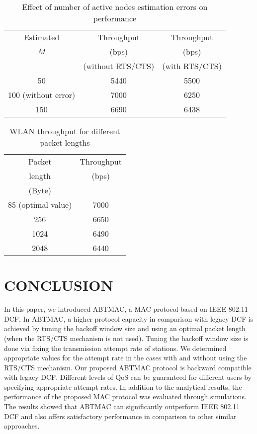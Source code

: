 \documentclass[10pt,twocolumn,oneside,submit]{JCNtran}
\begin{document}
\begin{table}
\caption{Effect of number of active nodes estimation errors on performance}
\label{tab:tab4}
\begin{center}
{\small \begin{tabular}{|c|c|c|}\hline
 Estimated & Throughput & Throughput \\
$M$ & (bps) & (bps) \\
  & (without RTS/CTS) & (with RTS/CTS) \\  
\hline
50 & 5440 & 5500\\
100 (without error) & 7000 & 6250 \\
150 & 6690 & 6438 \\ \hline
\end{tabular}}
\end{center}
\end{table}
\begin{table}
\caption{WLAN throughput for different packet lengths}
\label{tab:tab5}
\begin{center}
{\small \begin{tabular}{|c|c|}\hline
 Packet & Throughput \\
length & (bps) \\
 (Byte) &  \\  
\hline
85 (optimal value) & 7000\\
256 & 6650 \\
1024 & 6490 \\
2048 & 6440 \\ \hline
\end{tabular}}
\end{center}
\end{table}
\vspace{10pt}
\section{\uppercase{CONCLUSION}}
\label{sec:conc}
\par In this paper, we introduced ABTMAC, a MAC protocol based on IEEE 802.11 DCF. In ABTMAC, a higher protocol capacity in comparison with legacy DCF is achieved by tuning the backoff window size and using an optimal packet length (when the RTS/CTS mechanism is not used). Tuning the backoff window size is done via fixing the transmission attempt rate of stations. We determined appropriate values for the attempt rate in the cases with and without using the RTS/CTS mechanism. Our proposed ABTMAC protocol is backward compatible with legacy DCF. Different levels of QoS can be guaranteed for different users by specifying appropriate attempt rates. In addition to the analytical results, the performance of the proposed MAC protocol was evaluated through simulations. The results showed that ABTMAC can significantly outperform IEEE 802.11 DCF and also offers satisfactory performance in comparison to other similar approaches.

\end{document}
